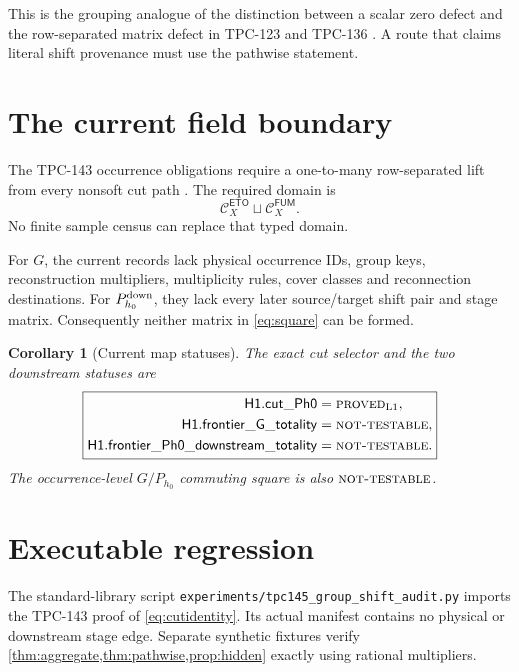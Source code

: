 \documentclass[11pt]{article}
\newtheorem{corollary}[theorem]{Corollary}
\theoremstyle{definition}
\theoremstyle{remark}
\newcommand{\NT}{\textnormal{\textsc{not-testable}}}
\newcommand{\PROVED}{\textnormal{\textsc{proved}}}
\newcommand{\Lone}{\mathrm{L1}}
\begin{document}
This is the grouping analogue of the distinction between a scalar
zero defect and the row-separated matrix defect in TPC-123 and
TPC-136 \citep{WangTPC123,WangTPC136}.  A route that claims literal
shift provenance must use the pathwise statement.

\section{The current field boundary}

The TPC-143 occurrence obligations require a one-to-many
row-separated lift from every nonsoft cut path
\citep{WangTPC143}.  The required domain is
\[
 \mathcal C_X^{\mathsf{ETO}}\sqcup
 \mathcal C_X^{\mathsf{FUM}}.
\]
No finite sample census can replace that typed domain.

For \(G\), the current records lack physical occurrence IDs, group
keys, reconstruction multipliers, multiplicity rules, cover classes
and reconnection destinations.  For \(P_{h_0}^{\rm down}\), they lack
every later source/target shift pair and stage matrix.  Consequently
neither matrix in \eqref{eq:square} can be formed.

\begin{corollary}[Current map statuses]
\label{cor:status}
The exact cut selector and the two downstream statuses are
\[
\boxed{
\begin{aligned}
\mathsf{H1.cut\_Ph0}&=\PROVED_{\Lone},\\
\mathsf{H1.frontier\_G\_totality}&=\NT,\\
\mathsf{H1.frontier\_Ph0\_downstream\_totality}&=\NT.
\end{aligned}}
\]
The occurrence-level \(G/P_{h_0}\) commuting square is also
\(\NT\).
\end{corollary}

\section{Executable regression}

The standard-library script
\texttt{experiments/tpc145\_group\_shift\_audit.py} imports the
TPC-143 proof of \eqref{eq:cutidentity}.  Its actual manifest contains
no physical or downstream stage edge.  Separate synthetic fixtures
verify \cref{thm:aggregate,thm:pathwise,prop:hidden} exactly using
rational multipliers.
\end{document}

